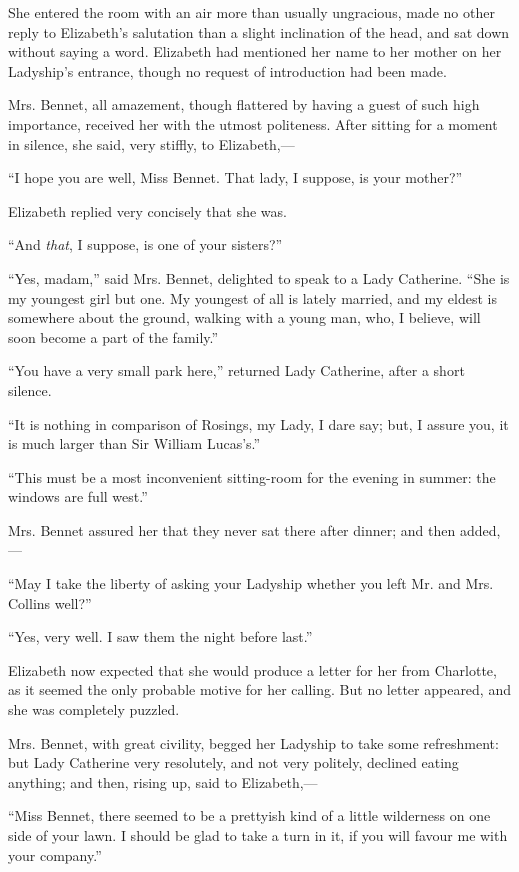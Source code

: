 \documentclass[12pt]{book}
\begin{document}
She entered the room with an air more than usually ungracious, made no other reply to Elizabeth's salutation than a slight inclination of the head, and sat down without saying a word. Elizabeth had mentioned her name to her mother on her Ladyship's entrance, though no request of introduction had been made.

Mrs. Bennet, all amazement, though flattered by having a guest of such high importance, received her with the utmost politeness. After sitting for a moment in silence, she said, very stiffly, to Elizabeth,---

``I hope you are well, Miss Bennet. That lady, I suppose, is your mother?''

Elizabeth replied very concisely that she was.

``And \textit{that}, I suppose, is one of your sisters?''

``Yes, madam,'' said Mrs. Bennet, delighted to speak to a Lady Catherine. ``She is my youngest girl but one. My youngest of all is lately married, and my eldest is somewhere about the ground, walking with a young man, who, I believe, will soon become a part of the family.''

``You have a very small park here,'' returned Lady Catherine, after a short silence.

``It is nothing in comparison of Rosings, my Lady, I dare say; but, I assure you, it is much larger than Sir William Lucas's.''

``This must be a most inconvenient sitting-room for the evening in summer: the windows are full west.''

Mrs. Bennet assured her that they never sat there after dinner; and then added,---

``May I take the liberty of asking your Ladyship whether you left Mr. and Mrs. Collins well?''

``Yes, very well. I saw them the night before last.''

Elizabeth now expected that she would produce a letter for her from Charlotte, as it seemed the only probable motive for her calling. But no letter appeared, and she was completely puzzled.

Mrs. Bennet, with great civility, begged her Ladyship to take some refreshment: but Lady Catherine very resolutely, and not very politely, declined eating anything; and then, rising up, said to Elizabeth,---

``Miss Bennet, there seemed to be a prettyish kind of a little wilderness on one side of your lawn. I should be glad to take a turn in it, if you will favour me with your company.''
\end{document}
